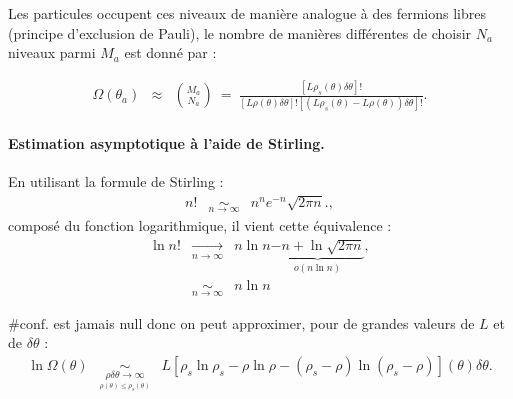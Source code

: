 Les particules occupent ces niveaux de manière analogue à des fermions libres (principe d’exclusion de Pauli), le nombre de manières différentes de choisir $N_a$ niveaux parmi $M_a$ est donné par :
	
	
	\begin{figure}[H]
		\centering 
		\captionsetup{skip=10pt} %
	\end{figure}
	
	
\begin{eqnarray}
	\Omega(\theta_a) & \approx  & \binom{M_a}{N_a} ~= ~   \frac{[ L\rho_s ( \theta ) \delta \theta ] ! }{ [ L\rho ( \theta ) \delta \theta ] ! [( L\rho_s ( \theta ) - L\rho ( \theta ) )  \delta \theta ] ! }. 	
\end{eqnarray}

\paragraph{Estimation asymptotique à l’aide de Stirling.}

En utilisant la formule de Stirling :
\begin{eqnarray}
	n! & \underset{n \to \infty}{\sim} &  n^n e^{-n} \sqrt{2\pi n}.,
\end{eqnarray}	
composé du fonction logarithmique, il vient cette équivalence : 
\begin{eqnarray}
	\ln n! & \underset{n \to \infty}{\rightarrow} & n \ln n \underbrace{- n + \ln \sqrt{2 \pi n }}_{o \left ( n \ln n \right ) } ,\\
	&  \underset{n \to \infty}{\sim} & n \ln n  
\end{eqnarray}
	
$\# \mbox{conf.}$ est jamais null donc on peut approximer, pour de grandes valeurs de $L$ et de $\delta\theta$  : 
\begin{eqnarray}
    \ln \Omega(\theta) & \underset{\underset{\rho (\theta )\leq  \rho_s (\theta )}{\rho \delta \theta  \to \infty}}{\sim}   & L [ \rho_s\ln \rho_s - \rho \ln \rho - (\rho_s - \rho ) \ln ( \rho_s - \rho) ] (\theta )\delta \theta .
\end{eqnarray}


